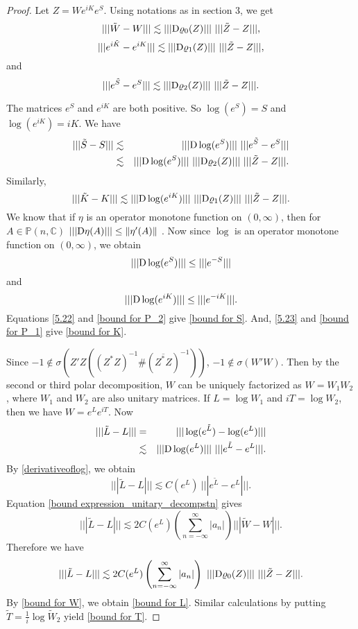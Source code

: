 \documentclass[12pt,epsfig,reqno]{amsart}
\newcommand{\De}{{\rm D}}
\theoremstyle{remark}
\begin{document}
\begin{proof}
Let $Z= W e^{iK}e^S$. Using notations as in section 3, we get
\begin{equation}
|||\tilde{W}-W|||\lesssim |||\De\varrho_0(Z)|||\ |||\tilde{Z}-Z|||,
\end{equation}
\begin{equation}
|||e^{i\tilde{K}}- e^{iK}|||\lesssim |||\De\varrho_1(Z)|||\ |||\tilde{Z}-Z|||,
\end{equation}
and \begin{equation}
|||e^{\tilde{S}}- e^S|||\lesssim |||\De \varrho_2(Z)|||\ |||\tilde{Z}-Z|||.
\end{equation}

The matrices $e^S$ and $e^{iK}$ are both positive.  So  $\log(e^S)=S$ and $\log(e^{iK})= iK$.
We have
\begin{eqnarray}
|||\tilde S-S|||&\lesssim& |||\De \log (e^S)|||\ |||e^{\tilde S}-e^S|||\nonumber\\
&\lesssim & |||\De \log (e^S)|||\ |||\De \varrho_2(Z)|||\ |||\tilde Z-Z|||.
\end{eqnarray}
Similarly,
\begin{equation}
|||\tilde K-K|||\lesssim |||\De \log(e^{iK})|||\ |||\De \varrho_1(Z)||| \ |||\tilde Z-Z|||.
\end{equation}
We know that if $\eta$ is an operator monotone function on $(0,\infty)$, then for $A\in \mathbb P(n,\mathbb C)$
$|||\De \eta(A)|||\leq \|\eta'(A)\|$ \cite[Theorem X.3.4]{bhatia_matrix_analysis}.  Now since $\log$ is an operator monotone function on $(0,\infty)$, we obtain \begin{equation}
|||\De \log(e^S)|||\leq |||e^{-S}|||\label{5.22}
\end{equation} and
\begin{equation}
|||\De \log(e^{iK})|||\leq |||e^{-iK}|||.\label{5.23}
\end{equation}
Equations \eqref{5.22} and \eqref{bound for P_2} give \eqref{bound for S}. And, \eqref{5.23} and \eqref{bound for P_1} give \eqref{bound for K}.

 Since $-1\notin \sigma(Z'Z ((Z^*Z)^{-1}\# (\overline{Z^*Z})^{-1}))$, $-1\notin \sigma(W'W)$. Then by the second or third polar decomposition, $W$ can be uniquely factorized as $W=W_1W_2$, where $W_1$ and $W_2$ are also unitary matrices. If $L= \log W_1$ and $iT= \log W_2$, then we have $W= e^L e^{iT}$. Now
\begin{eqnarray*}
|||\tilde{L}-L|||&=& |||\log (e^{\tilde{L}})-\log (e^L)|||\\
&\lesssim& |||\De\log(e^L)|||\ |||e^{\tilde{L}}-e^L|||.
\end{eqnarray*}
By \eqref{derivativeoflog}, we obtain
$$
|||\tilde{L}-L|||\lesssim  C({e^L}) \ |||e^{\tilde{L}}-e^L|||.$$
Equation \eqref{bound expression_unitary_decompstn} gives
$$|||\tilde{L}-L|||\lesssim 2 C({e^L})\left(\sum_{n=-\infty}^{\infty} |a_n|\right)|||\tilde{W}-W|||.$$
Therefore we have
$$|||\tilde{L}-L|||\lesssim 2 C({e^L})\left(\sum_{n=-\infty}^{\infty} |a_n|\right)\ |||\De \varrho_0(Z)|||\ |||\tilde{Z}-Z|||.$$
By \eqref{bound for W}, we obtain \eqref{bound for L}.
Similar calculations by putting   $\tilde T=\frac{1}{i} \log \tilde W_2$ yield \eqref{bound for T}.
\end{proof}
\end{document}
